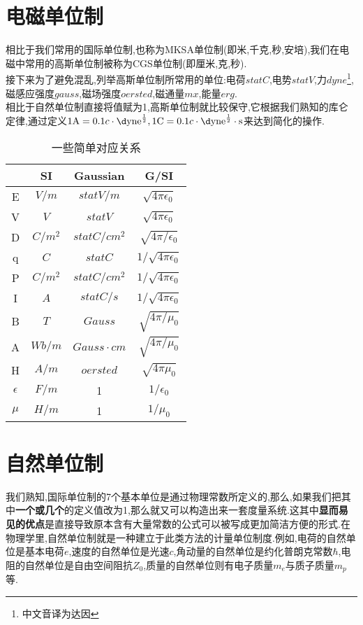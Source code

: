 \section{电磁单位制}
相比于我们常用的国际单位制,也称为MKSA单位制(即米,千克,秒,安培),我们在电磁中常用的高斯单位制被称为CGS单位制(即厘米,克,秒).\\接下来为了避免混乱,列举高斯单位制所常用的单位:电荷$statC$,电势$statV$,力$dyne$\footnote{中文音译为达因},磁感应强度$gauss$,磁场强度$oersted$,磁通量$mx$,能量$erg$.\\

相比于自然单位制直接将值赋为1,高斯单位制就比较保守,它根据我们熟知的库仑定律,通过定义$1\mathrm{A}=0.1c\cdot\mathrm{\d yne}^{\frac12},1\mathrm{C}=0.1c\cdot\rm{\d yne}^{\frac12}\cdot s$来达到简化的操作.\\
\begin{table}[htbp]
	\centering
	\caption{一些简单对应关系}
	\begin{tabular}{|c|c|c|c|}
		\hline
		& SI      & Gaussian        & G/SI                     \\ \hline
		E          & $V/m$   & $statV/m$       & $\sqrt{4\pi\epsilon_0}$  \\ \hline
		V          & $V$     & $statV$         & $\sqrt{4\pi\epsilon_0}$  \\ \hline
		D          & $C/m^2$ & $statC/cm^2$    & $\sqrt{4\pi/\epsilon_0}$ \\ \hline
		q          & $C$     & $statC$         & $1/\sqrt{4\pi\epsilon_0}$ \\ \hline
		P          & $C/m^2$ & $statC/cm^2$    & $1/\sqrt{4\pi\epsilon_0}$ \\ \hline
		I          & $A$     & $statC/s$       & $1/\sqrt{4\pi\epsilon_0}$ \\ \hline
		B          & $T$     & $Gauss$         & $\sqrt{4\pi/\mu_0}$      \\ \hline
		A          & $Wb/m$  & $Gauss\cdot cm$ & $\sqrt{4\pi/\mu_0}$      \\ \hline
		H          & $A/m$   & $oersted$       & $\sqrt{4\pi\mu_0}$       \\ \hline
		$\epsilon$ & $F/m$   & 1               & $1/\epsilon_0$           \\ \hline
		$\mu$      & $H/m$   & 1               & $1/\mu_0$                \\ \hline
	\end{tabular}
\end{table}
\section{自然单位制}
我们熟知,国际单位制的7个基本单位是通过物理常数所定义的,那么,如果我们把其中\textbf{一个或几个}的定义值改为1,那么就又可以构造出来一套度量系统.这其中\textbf{显而易见的优点}是直接导致原本含有大量常数的公式可以被写成更加简洁方便的形式.在物理学里,自然单位制就是一种建立于此类方法的计量单位制度.例如,电荷的自然单位是基本电荷${\displaystyle e}$,速度的自然单位是光速${\displaystyle c}$,角动量的自然单位是约化普朗克常数${\displaystyle \hbar }$,电阻的自然单位是自由空间阻抗${\displaystyle Z_{0}}$,质量的自然单位则有电子质量${\displaystyle m_{e}}$与质子质量${\displaystyle m_{p}}$等.\\

